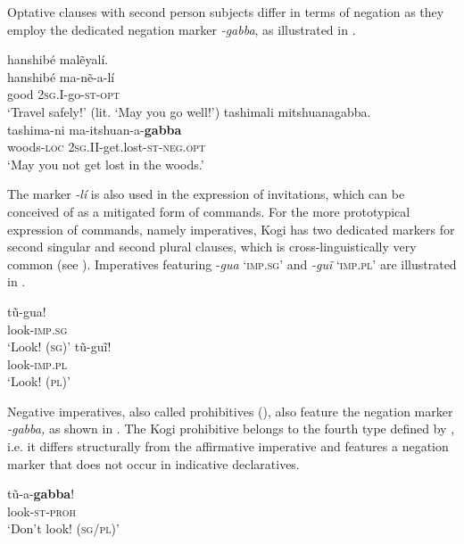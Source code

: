 \documentclass[output=paper,colorlinks,citecolor=brown]{langscibook}
\begin{document}
Optative clauses with second person subjects differ in terms of negation as they employ the dedicated negation marker \textit{{}-gabba}, as illustrated in .

\ea\label{ex:kog:28}
    \ea\label{ex:kog:28a}hanshibé malẽyalí.\\
        \gll  hanshibé ma-nẽ-a-lí\\ 
              good \textsc{2sg.I{}-}go\textsc{{}-st-opt}\\
        \glt  ‘Travel safely!’ (lit. ‘May you go well!')
    \ex\label{ex:kog:28b}tashimali mitshuanagabba.\\
        \gll  tashima-ni ma-itshuan{}-a-\textbf{gabba}\\
              woods-\textsc{loc} \textsc{2sg.II{}-}get.lost\textsc{{}-st-neg.opt}\\
        \glt ‘May you not get lost in the woods.’
    \z
\z 

The marker \textit{{}-lí} is also used in the expression of invitations, which can be conceived of as a mitigated form of commands. For the more prototypical expression of commands, namely imperatives, Kogi has two dedicated markers for second singular and second plural clauses, which is cross-linguistically very common (see \citealt{AuweraEtAl2013}). Imperatives featuring {}-\textit{gua} ‘\textsc{imp.sg’} and \textit{{}-guĩ} ‘\textsc{imp.pl’} are illustrated in .

\ea\label{ex:kog:29}
    \ea\label{ex:kog:29a}
        \gll  tũ-gua!\\ 
             look-\textsc{imp.sg}\\
        \glt ‘Look! (\textsc{sg})’
    \ex\label{ex:kog:29b}
        \gll  tũ-guĩ!\\
              look-\textsc{imp.pl}\\
        \glt ‘Look! (\textsc{pl})’
    \z
\z 

Negative imperatives, also called prohibitives (\citealt{AuweraEtAl2013-wals70}), also feature the negation marker \textit{{}-gabba,} as shown in . The Kogi prohibitive belongs to the fourth type defined by \citet{AuweraEtAl2013-wals70}, i.e. it differs structurally from the affirmative imperative and features a negation marker that does not occur in indicative declaratives.

\ea\label{ex:kog:30}
    \gll tũ{}-a-\textbf{gabba}!\\
         look\textsc{{}-st}{}-\textsc{proh}\\
    \glt‘Don't look! (\textsc{sg/pl})’
\z    
\end{document}
